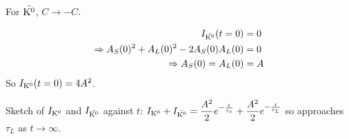 \begin{parts}
	For $\bar{\mathrm{K}^{0}}$, $C \to -C$.
	
	\begin{align*}
		I_{\bar{\mathrm{K}^{0}}} (t=0) &= 0 \\
		\Rightarrow A_S(0)^2 + A_L(0)^2 - 2A_S(0) A_L(0) &= 0 \\
		\Rightarrow A_S(0) = A_L(0) &= A
	\end{align*}
	So $I_{\mathrm{K}^{0}} (t=0) = 4A^2$.
	
	Sketch of $I_{\mathrm{K}^{0}}$ and $I_{\bar{\mathrm{K}^{0}}}$ against $t$:
	$I_{\mathrm{K}^{0}} + I_{\bar{\mathrm{K}^{0}}} = \dfrac{A^2}{2} e^{-\frac{t}{\tau_s}} + \dfrac{A^2}{2} e^{-\frac{t}{\tau_L}}$ so approaches $\tau_L$ as $t \to \infty$.
\end{parts}